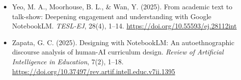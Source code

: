 \begin{itemize}[leftmargin=1.5em, label={}, itemsep=0.22ex, parsep=0pt]
    \item Yeo, M. A., Moorhouse, B. L., \& Wan, Y. (2025). From academic text to talk-show: Deepening engagement and understanding with Google NotebookLM. \textit{TESL-EJ}, 28(4), 1--14. \url{https://doi.org/10.55593/ej.28112int}
    \item Zapata, G. C. (2025). Designing with NotebookLM: An autoethnographic discourse analysis of human-AI curriculum design. \textit{Review of Artificial Intelligence in Education}, 7(2), 1--18. \url{https://doi.org/10.37497/rev.artif.intell.educ.v7ii.1395}
\end{itemize}
